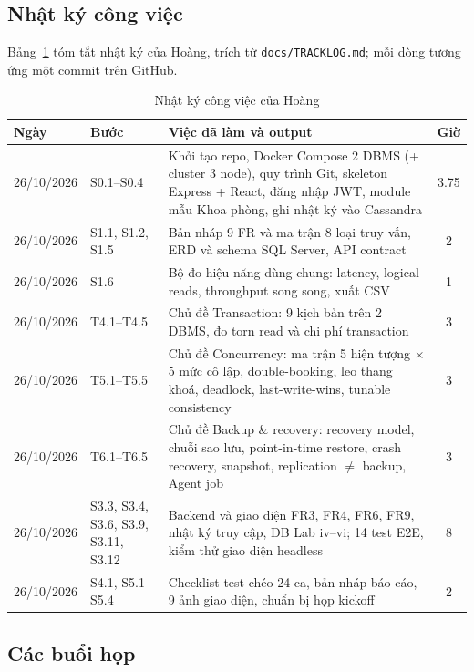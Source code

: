 \subsection{Nhật ký công việc}
Bảng~\ref{tab:tracklog-hoang} tóm tắt nhật ký của Hoàng, trích từ \texttt{docs/TRACKLOG.md}; mỗi dòng tương ứng một commit trên GitHub.

\begin{table}[H]
\centering
\caption{Nhật ký công việc của Hoàng}
\label{tab:tracklog-hoang}
\small
\begin{tabularx}{\linewidth}{|p{1.6cm}|p{2.2cm}|X|c|}
\hline
\textbf{Ngày} & \textbf{Bước} & \textbf{Việc đã làm và output} & \textbf{Giờ} \\ \hline
26/10/2026 & S0.1--S0.4 & Khởi tạo repo, Docker Compose 2 DBMS (+ cluster 3 node), quy trình Git, skeleton Express + React, đăng nhập JWT, module mẫu Khoa phòng, ghi nhật ký vào Cassandra & 3.75 \\ \hline
26/10/2026 & S1.1, S1.2, S1.5 & Bản nháp 9 FR và ma trận 8 loại truy vấn, ERD và schema SQL Server, API contract & 2 \\ \hline
26/10/2026 & S1.6 & Bộ đo hiệu năng dùng chung: latency, logical reads, throughput song song, xuất CSV & 1 \\ \hline
26/10/2026 & T4.1--T4.5 & Chủ đề Transaction: 9 kịch bản trên 2 DBMS, đo torn read và chi phí transaction & 3 \\ \hline
26/10/2026 & T5.1--T5.5 & Chủ đề Concurrency: ma trận 5 hiện tượng $\times$ 5 mức cô lập, double-booking, leo thang khoá, deadlock, last-write-wins, tunable consistency & 3 \\ \hline
26/10/2026 & T6.1--T6.5 & Chủ đề Backup \& recovery: recovery model, chuỗi sao lưu, point-in-time restore, crash recovery, snapshot, replication $\neq$ backup, Agent job & 3 \\ \hline
26/10/2026 & S3.3, S3.4, S3.6, S3.9, S3.11, S3.12 & Backend và giao diện FR3, FR4, FR6, FR9, nhật ký truy cập, DB Lab iv--vi; 14 test E2E, kiểm thử giao diện headless & 8 \\ \hline
26/10/2026 & S4.1, S5.1--S5.4 & Checklist test chéo 24 ca, bản nháp báo cáo, 9 ảnh giao diện, chuẩn bị họp kickoff & 2 \\ \hline
\end{tabularx}
\end{table}


\subsection{Các buổi họp}

